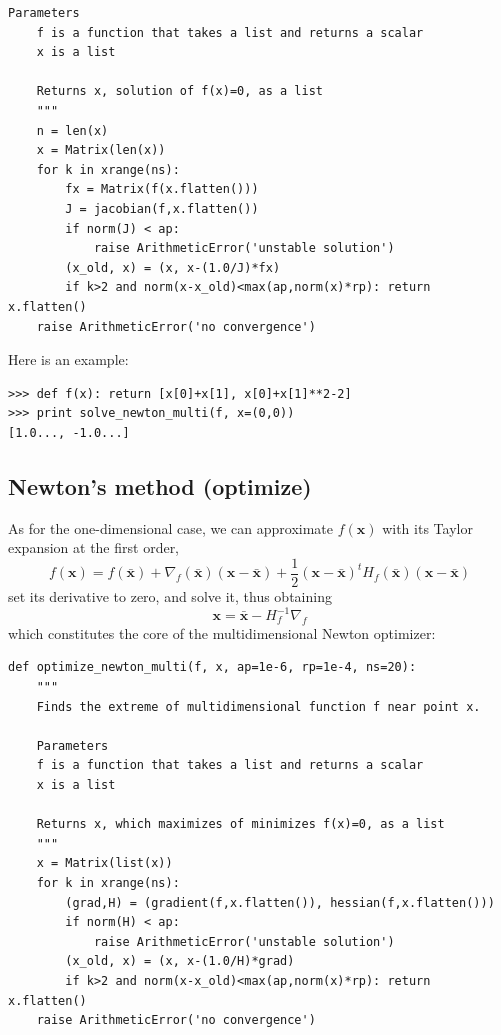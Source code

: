 \documentclass[justified,sixbynine]{tufte-book}
\def\ft{\small\tt}
\theoremstyle{plain}%
\theoremstyle{definition}
\theoremstyle{remark}
\begin{document}
\begin{fullwidth}
\begin{lstlisting}[caption={in file: {\ft nlib.py}}]
    Parameters
    f is a function that takes a list and returns a scalar
    x is a list

    Returns x, solution of f(x)=0, as a list
    """
    n = len(x)
    x = Matrix(len(x))
    for k in xrange(ns):
        fx = Matrix(f(x.flatten()))
        J = jacobian(f,x.flatten())
        if norm(J) < ap:
            raise ArithmeticError('unstable solution')
        (x_old, x) = (x, x-(1.0/J)*fx)
        if k>2 and norm(x-x_old)<max(ap,norm(x)*rp): return x.flatten()
    raise ArithmeticError('no convergence')
\end{lstlisting}

Here is an example:

\begin{lstlisting}[caption={in file: {\ft nlib.py}}]
>>> def f(x): return [x[0]+x[1], x[0]+x[1]**2-2]
>>> print solve_newton_multi(f, x=(0,0))
[1.0..., -1.0...]
\end{lstlisting}

\goodbreak\subsection{Newton's method (optimize)}


As for the one-dimensional case, we can approximate $f(\mathbf{x})$ with its Taylor expansion at the first order,
\begin{equation}
f(\mathbf{x}) = f(\mathbf{\bar x}) + \nabla_f(\mathbf{\bar x})(\mathbf{x}-\mathbf{\bar x}) +
\frac12 (\mathbf{x}-\mathbf{\bar x})^t H_f(\mathbf{\bar x})(\mathbf{x}-\mathbf{\bar x})
\end{equation}
set its derivative to zero, and solve it, thus obtaining
\begin{equation}
\mathbf{x} = \mathbf{\bar x} - H^{-1}_f \nabla_f
\end{equation}
which constitutes the core of the multidimensional Newton optimizer:

\begin{lstlisting}[caption={in file: {\ft nlib.py}}]
def optimize_newton_multi(f, x, ap=1e-6, rp=1e-4, ns=20):
    """
    Finds the extreme of multidimensional function f near point x.

    Parameters
    f is a function that takes a list and returns a scalar
    x is a list

    Returns x, which maximizes of minimizes f(x)=0, as a list
    """
    x = Matrix(list(x))
    for k in xrange(ns):
        (grad,H) = (gradient(f,x.flatten()), hessian(f,x.flatten()))
        if norm(H) < ap:
            raise ArithmeticError('unstable solution')
        (x_old, x) = (x, x-(1.0/H)*grad)
        if k>2 and norm(x-x_old)<max(ap,norm(x)*rp): return x.flatten()
    raise ArithmeticError('no convergence')
\end{lstlisting}


\end{fullwidth}
\end{document}
